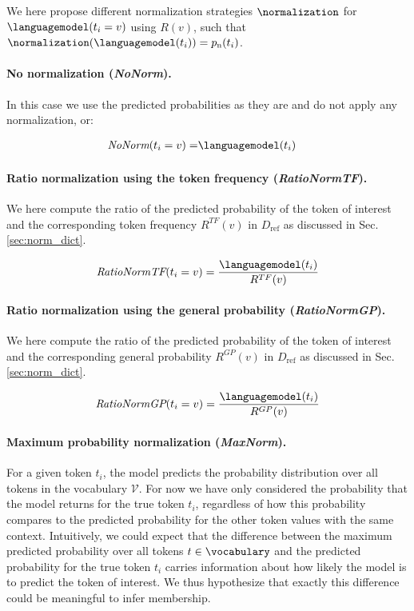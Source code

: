 \documentclass[twocolumn,10pt]{article}
\begin{document}
We here propose different normalization strategies $\normalization$ for $\languagemodel(t_i=v)$ using $R(v)$, such that $\normalization(\languagemodel(t_i))=p_{\text{n}}(t_i)$.

\paragraph{\textbf{No normalization (\textit{NoNorm}).}} In this case we use the predicted probabilities as they are and do not apply any normalization, or: 

\begin{align}
    \textit{NoNorm}(t_i=v) = & \languagemodel(t_i)
\end{align}

\paragraph{\textbf{Ratio normalization using the token frequency (\textit{RatioNormTF}).}} We here compute the ratio of the predicted probability of the token of interest and the corresponding token frequency $R^{TF}(v)$ in $D_\text{ref}$ as discussed in Sec. \ref{sec:norm_dict}.

\begin{align}
\textit{RatioNormTF}(t_i=v) =  \frac{\languagemodel(t_i)}{R^{TF}(v)}
\end{align}

\paragraph{\textbf{Ratio normalization using the general probability (\textit{RatioNormGP}).}} We here compute the ratio of the predicted probability of the token of interest and the corresponding general probability $R^{GP}(v)$ in $D_\text{ref}$ as discussed in Sec. \ref{sec:norm_dict}. 

\begin{align}
\textit{RatioNormGP}(t_i=v) =  \frac{\languagemodel(t_i)}{R^{GP}(v)}
\end{align}

\paragraph{\textbf{Maximum probability normalization (\textit{MaxNorm}).}} For a given token $t_i$, the model predicts the probability distribution over all tokens in the vocabulary $\mathcal{V}$. For now we have only considered the probability that the model returns for the true token $t_i$, regardless of how this probability compares to the predicted probability for the other token values with the same context. Intuitively, we could expect that the difference between the maximum predicted probability over all tokens $t \in \vocabulary$ and the predicted probability for the true token $t_i$ carries information about how likely the model is to predict the token of interest. We thus hypothesize that exactly this difference could be meaningful to infer membership.
\end{document}
